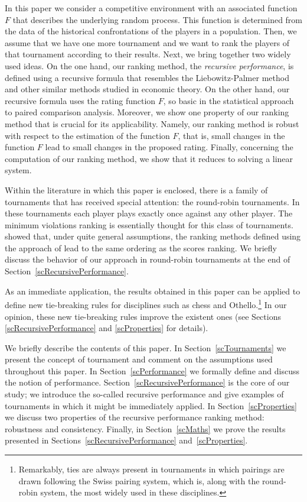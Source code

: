 \documentclass[a4paper,10pt]{article}
\theoremstyle{remark}
\begin{document}
In this paper we consider a competitive environment with an
associated function $F$ that describes the underlying random
process. This function is determined from the data of the
historical confrontations of the players in a population. Then, we
assume that we have one more tournament and we want to rank the
players of that tournament according to their results. Next, we
bring together two widely used ideas. On the one hand, our ranking
method, the \emph{recursive performance}, is defined using a
recursive formula that resembles the Liebowitz-Palmer method
\citep{Liebowitz:1984} and other similar methods
\citep{Volij:2004} studied in economic theory. On the other hand,
our recursive formula uses the rating function $F$, so basic in
the statistical approach to paired comparison analysis. Moreover,
we show one property of our ranking method that is crucial for its
applicability. Namely, our ranking method is robust with respect
to the estimation of the function $F$, that is, small changes in
the function $F$ lead to small changes in the proposed rating.
Finally, concerning the computation of our ranking method, we show
that it reduces to solving a linear system.

Within the literature in which this paper is enclosed, there is a
family of tournaments that has received special attention: the
round-robin tournaments. In these tournaments each player plays
exactly once against any other player. The minimum violations
ranking is essentially thought for this class of tournaments.
\cite{Stob:1985} showed that, under quite general assumptions, the
ranking methods defined using the approach of \cite{Zermelo:1929}
lead to the same ordering as the scores ranking. We briefly discuss the behavior of our approach in round-robin tournaments at the end of Section~\ref{scRecursivePerformance}.

As an immediate application, the results obtained in this paper
can be applied to define new tie-breaking rules for disciplines
such as chess and Othello.\footnote{Remarkably, ties are always
present in tournaments in which pairings are drawn following the
Swiss pairing system, which is, along with the round-robin system,
the most widely used in these disciplines.} In our opinion, these
new tie-breaking rules improve the existent ones (see Sections
\ref{scRecursivePerformance} and \ref{scProperties} for details).

We briefly describe the contents of this paper. In
Section~\ref{scTournaments} we present the concept of tournament
and comment on the assumptions used throughout this paper. In
Section~\ref{scPerformance} we formally define and discuss the
notion of performance. Section~\ref{scRecursivePerformance} is the
core of our study; we introduce the so-called recursive
performance and give examples of tournaments in which it might be
immediately applied. In Section~\ref{scProperties} we discuss two
properties of the recursive performance ranking method: robustness
and consistency. Finally, in Section~\ref{scMaths} we prove the
results presented in Sections~\ref{scRecursivePerformance} and~\ref{scProperties}.
\end{document}
